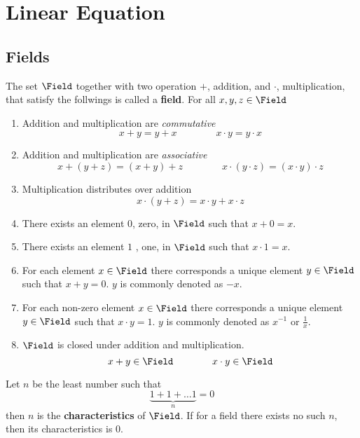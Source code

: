 \chapter{Linear Equation}
\thispagestyle{headings}
\section{Fields}
The set \(\Field\) together with two operation \(+\), addition, and \(\cdot\), multiplication, that satisfy the follwings is called a \textbf{field}. For all \(x,y,z \in \Field\)
\begin{enumerate}
    \item Addition and multiplication are \textit{commutative}
          \[ x + y = y + x \qquad \qquad x \cdot y = y \cdot x\]
    \item Addition and multiplication are \textit{associative}
          \[x + (y + z) = (x + y) + z \qquad \qquad x \cdot (y \cdot z) = (x \cdot y) \cdot z\]
    \item Multiplication distributes over addition
          \[x \cdot (y + z)  = x \cdot y +  x \cdot z\]
    \item There exists an element \(0\), zero, in \(\Field\) such that \(x + 0 = x\).
    \item There exists an element \(1\) , one, in \(\Field\) such that \(x \cdot 1 = x\).
    \item For each element \(x \in \Field\) there corresponds a unique element \( y \in \Field\) such that \(x + y  = 0\). \(y\) is commonly denoted as \(-x\).
    \item For each non-zero element \(x \in \Field\) there corresponds a unique element \( y \in \Field\) such that \(x \cdot y  = 1\). \(y\) is commonly denoted as \(x^{-1}\) or \(\frac{1}{x}\).
    \item \(\Field\) is closed under addition and multiplication.
          \[x + y \in \Field \qquad \qquad x \cdot y \in \Field\]
\end{enumerate}

\begin{definition} [Characteristics]
    Let \(n\) be the least number such that
    \begin{equation}
        \underbrace{1 + 1 + \dots 1}_{n} = 0
    \end{equation}
    then \(n\) is the \textbf{characteristics} of \(\Field\). If for a field there exists no such \(n\), then its characteristics is \(0\).
\end{definition}

